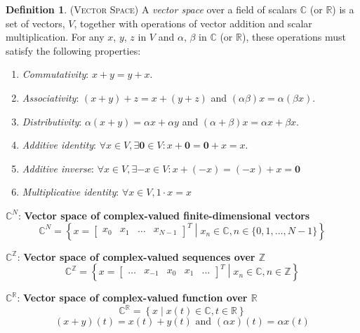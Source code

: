 \documentclass[9pt, twocolumn]{extarticle}
\theoremstyle{definition}
\newtheorem{definition}{Definition}
\begin{document}
  \begin{definition}{(\textsc{Vector Space})}
    A \emph{vector space} over a field of scalars $ \mathds{C} $ (or $ \mathds{R} $) is a set of vectors, $ V$, together with operations of vector addition and scalar multiplication. For any $x$, $y$, $z$ in $ V $ and $ \alpha $, $ \beta $ in $ \mathds{C} $ (or $ \mathds{R} $), these operations must satisfy the following properties:
    \begin{enumerate}[label=(\roman*)]
      \item \emph{Commutativity}: $ x + y=y+x $.
      \item \emph{Associativity}: $ (x+y)+z=x+(y+z) $ and $ (\alpha\beta)x=\alpha(\beta x) $.
      \item \emph{Distributivity}: $ \alpha(x+y)= \alpha x + \alpha y $ and $ (\alpha+\beta)x=\alpha x + \beta x .$
      \item \emph{Additive identity}: $\forall x\in V, \exists \textbf{0} \in V : x + \textbf{0} = \textbf{0} + x = x$.
      \item \emph{Additive inverse}: $ \forall x\in V, \exists -x\in V: x+(-x)=(-x)+x=\textbf{0} $
      \item \emph{Multiplicative identity}: $ \forall x\in V, 1\cdot x = x$
    \end{enumerate}
  \end{definition}

\noindent$ \mathds{C}^N $: \textbf{Vector space of complex-valued finite-dimensional vectors}\vspace{-0.18cm}
\[ \mathds{C}^N = \left\{x=\begin{bmatrix}x_0&x_1&\dots&x_{N-1}\end{bmatrix}^T \middle| x_n\in \mathds{C}, n\in \{0,1,\dots,N-1\}\right\} \]

\noindent$\mathds{C}^\mathds{Z}$: \textbf{Vector space of complex-valued sequences over $ \mathds{Z} $}\vspace{-0.18cm}
\[ \mathds{C}^\mathds{Z} = \left\{x=\begin{bmatrix}\dots&x_{-1}&x_0&x_1&\dots\end{bmatrix}^T \middle| x_n\in \mathds{C}, n\in \mathds{Z}\right\} \]

\noindent$\mathds{C}^\mathds{R}$: \textbf{Vector space of complex-valued function over $ \mathds{R} $}\vspace{-0.18cm}
\[ \mathds{C}^\mathds{R} = \left\{x \middle| x(t)\in \mathds{C}, t \in \mathds{R}\right\}\]\vspace{-0.5cm}\[(x+y)(t)=x(t)+y(t) \text{ and } (\alpha x)(t) = \alpha x(t) \]
\end{document}

